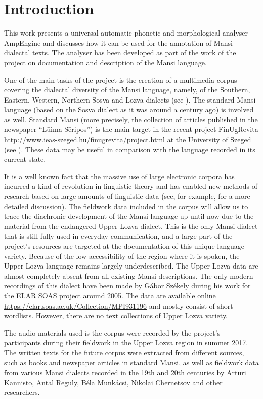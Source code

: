 \documentclass[b5paper,notitlepage]{article}
\begin{document}
\section{Introduction}

This work presents a universal automatic phonetic and morphological analyser AmpEngine and discusses how it can be used for the annotation of Mansi dialectal texts. The analyser has been developed as part of the work of the project on documentation and description of the Mansi language. 

One of the main tasks of the project is the creation of a multimedia corpus covering the dialectal diversity of the Mansi language, namely, of the Southern, Eastern, Western, Northern Sosva and Lozva dialects (see \cite{My}). The standard Mansi language (based on the Sosva dialect as it was around a century ago) is involved as well. Standard Mansi (more precisely, the collection of articles published in the newspaper “Lūima Sēripos”) is the main target in the recent project FinUgRevita \url{http://www.ieas-szeged.hu/finugrevita/project.html} at the University of Szeged (see \cite{LOXI}). These data may be useful in comparison with the language recorded in its current state.

It is a well known fact that the massive use of large electronic corpora has incurred a kind of revolution in linguistic theory and has enabled new methods of research based on large amounts of linguistic data (see, for example, \cite{Plungian 2008} for a more detailed discussion). The fieldwork data included in the corpus will allow us to trace the diachronic development of the Mansi language up until now due to the material from the endangered Upper Lozva dialect. This is the only Mansi dialect that is still fully used in everyday communication, and a large part of the project’s resources are targeted at the documentation of this unique language variety. Because of the low accessibility of the region where it is spoken, the Upper Lozva language remains largely underdescribed. The Upper Lozva data are almost completely absent from all existing Mansi descriptions. The only modern recordings of this dialect have been made by Gábor Székely during his work for the ELAR SOAS project around 2005. The data are available online \url{https://elar.soas.ac.uk/Collection/MPI931196} and mostly consist of short wordlists. However, there are no text collections of Upper Lozva variety. 

The audio materials used is the corpus were recorded by the project’s participants during their fieldwork in the Upper Lozva region in summer 2017. The written texts for the future corpus were extracted from different sources, such as books and newspaper articles in standard Mansi, as well as fieldwork data from various Mansi dialects recorded in the 19th and 20th centuries by Arturi Kannisto, Antal Reguly, Béla Munkácsi, Nikolai Chernetsov and other researchers.
\end{document}
